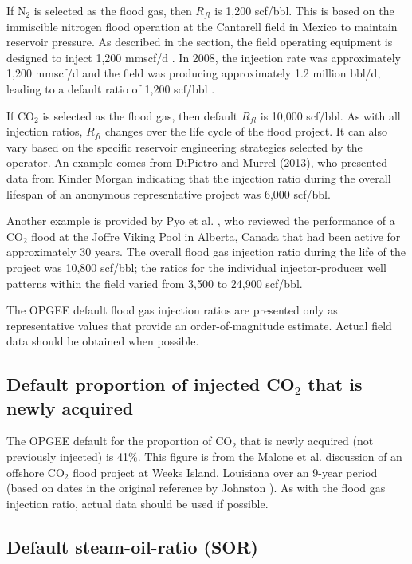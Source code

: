 \documentclass[11pt]{report}
\begin{document}
If N$_2$ is selected as the flood gas, then $R_{fl}$ is 1,200 scf/bbl. This is based on the immiscible nitrogen flood operation at the Cantarell field in Mexico to maintain reservoir pressure. As described in the  section, the field operating equipment is designed to inject 1,200 mmscf/d \cite{Kuo2001}. In 2008, the injection rate was approximately 1,200 mmscf/d and the field was producing approximately 1.2 million bbl/d, leading to a default ratio of 1,200 scf/bbl \cite{Guzman2014}.

If CO$_2$ is selected as the flood gas, then default $R_{fl}$ is 10,000 scf/bbl. As with all injection ratios, $R_{fl}$  changes over the life cycle of the flood project. It can also vary based on the specific reservoir engineering strategies selected by the operator.  An example comes from DiPietro and Murrel (2013), who presented data from Kinder Morgan indicating that the injection ratio during the overall lifespan of an anonymous representative project was 6,000 scf/bbl. 

Another example is provided by Pyo et al. \cite{Pyo2003}, who reviewed the performance of a CO$_2$ flood at the Joffre Viking Pool in Alberta, Canada that had been active for approximately 30 years. The overall flood gas injection ratio during the life of the project was 10,800 scf/bbl; the ratios for the individual injector-producer well patterns within the field varied from 3,500 to 24,900 scf/bbl. 

The OPGEE default flood gas injection ratios are presented only as representative values that provide an order-of-magnitude estimate. Actual field data should be obtained when possible.

\subsection{Default proportion of injected CO$_2$ that is newly acquired}
The OPGEE default for the proportion of CO$_2$ that is newly acquired (not previously injected) is 41\%. This figure is from the Malone et al. \cite{NETL2014} discussion of an offshore CO$_2$ flood project at Weeks Island, Louisiana over an 9-year period (based on dates in the original reference by Johnston \cite{Johnson1988}). As with the flood gas injection ratio, actual data should be used if possible. 

\subsection{Default steam-oil-ratio (SOR)}
\end{document}
